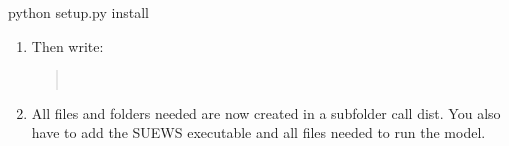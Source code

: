 \documentclass[letterpaper,10pt,english]{sphinxmanual}
\begin{document}
python setup.py install
\begin{enumerate}
\item {} 
Then write:
\begin{quote}

%
\begin{sphinxVerbatim}[commandchars=\\\{\}]
  
\end{sphinxVerbatim}
\end{quote}

\item {} 
All files and folders needed are now created in a subfolder call
dist. You also have to add the SUEWS executable and all files needed
to run the model.

\end{enumerate}
\end{document}
